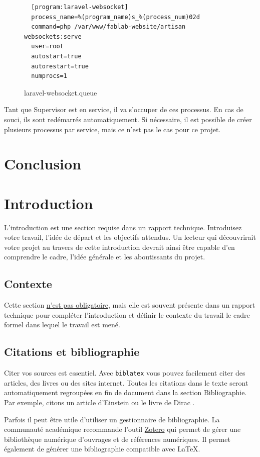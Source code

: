 \documentclass[
    iai, %
    eai, %
]{heig-tb}
\begin{document}
\begin{figure}[h]
  \begin{verbatim}
  [program:laravel-websocket]
  process_name=%(program_name)s_%(process_num)02d
  command=php /var/www/fablab-website/artisan websockets:serve
  user=root
  autostart=true
  autorestart=true
  numprocs=1
  \end{verbatim}
  \caption{laravel-websocket.queue}
\end{figure}

Tant que Supervisor est en service, il va s'occuper de ces processus. En cas de souci, ils sont redémarrés automatiquement. Si nécessaire, il est possible de créer plusieurs processus par service, mais ce n'est pas le cas pour ce projet.


\newpage
\chapter{Conclusion}
\chapter{Introduction}
L'introduction est une section requise dans un rapport technique. Introduisez votre travail, l'idée de départ et les objectifs attendus. Un lecteur qui découvrirait votre projet au travers de cette introduction devrait ainsi être capable d'en comprendre le cadre, l'idée générale et les aboutissants du projet.

\section{Contexte}
Cette section \underline{n'est pas obligatoire}, mais elle est souvent présente dans un rapport technique pour compléter l'introduction et définir le contexte du travail \cad le cadre formel dans lequel le travail est mené.

\section{Citations et bibliographie}
Citer vos sources est essentiel. Avec \texttt{biblatex} vous pouvez facilement citer des articles, des livres ou des sites internet. Toutes les citations dans le texte seront automatiquement regroupées en fin de document dans la section \guillemotleft Bibliographie\guillemotright. Par exemple, citons un article d'Einstein \cite{einstein} ou le livre de Dirac \cite{dirac}.

Parfois il peut être utile d'utiliser un gestionnaire de bibliographie. La communauté académique recommande l'outil \href{https://www.zotero.org/}{Zotero} qui permet de gérer une bibliothèque numérique d'ouvrages et de références numériques. Il permet également de générer une bibliographie compatible avec \LaTeX.
\end{document}
